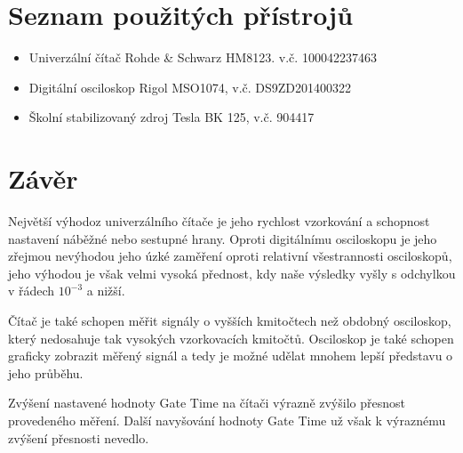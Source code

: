 \documentclass[a4paper, czech]{article}
\begin{document}
\section{Seznam použitých přístrojů}

\begin{itemize}
    \item Univerzální čítač Rohde \& Schwarz HM8123. v.č. 100042237463
    \item Digitální osciloskop Rigol MSO1074, v.č. DS9ZD201400322
    \item Školní stabilizovaný zdroj Tesla BK 125, v.č. 904417
\end{itemize}

\section{Závěr}

Největší výhodoz univerzálního čítače je jeho rychlost vzorkování a schopnost nastavení náběžné
nebo sestupné hrany.
Oproti digitálnímu osciloskopu je jeho zřejmou nevýhodou jeho úzké zaměření oproti relativní
všestrannosti osciloskopů, jeho výhodou je však velmi vysoká přednost, kdy naše
výsledky vyšly s odchylkou v řádech $10^{-3}$ a nižší.

Čítač je také schopen měřit signály o vyšších kmitočtech než obdobný osciloskop,
který nedosahuje tak vysokých vzorkovacích kmitočtů.
Osciloskop je také schopen graficky zobrazit měřený signál a tedy je možné udělat mnohem
lepší představu o jeho průběhu.

Zvýšení nastavené hodnoty Gate Time na čítači výrazně zvýšilo přesnost provedeného měření.
Další navyšování hodnoty Gate Time už však k výraznému zvýšení přesnosti nevedlo.
\end{document}
